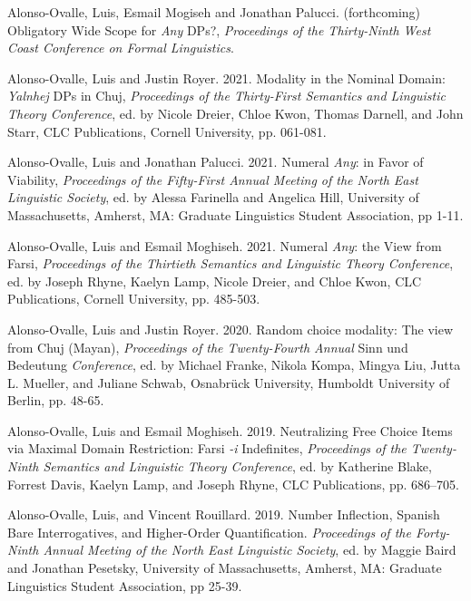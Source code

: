 \documentclass[11pt]{article}
\begin{document}
Alonso-Ovalle, Luis, Esmail Mogiseh and Jonathan Palucci. (forthcoming) Obligatory Wide Scope for \textit{Any} DPs?, \textit{Proceedings of the Thirty-Ninth West Coast Conference on Formal Linguistics}.

Alonso-Ovalle, Luis and Justin Royer. 2021. Modality in the Nominal Domain: \textit{Yalnhej} DPs in Chuj, \textit{Proceedings of the Thirty-First Semantics and Linguistic Theory Conference}, ed. by Nicole Dreier, Chloe Kwon, Thomas Darnell, and John Starr, CLC Publications, Cornell University, pp. 061-081.

Alonso-Ovalle, Luis and Jonathan Palucci. 2021. Numeral \textit{Any}: in Favor of Viability, \textit{Proceedings of the Fifty-First Annual Meeting of the North East Linguistic Society}, ed. by Alessa Farinella and Angelica Hill, University of Massachusetts, Amherst, MA: Graduate Linguistics Student Association, pp 1-11.

 Alonso-Ovalle, Luis and Esmail Moghiseh. 2021. Numeral \textit{Any}: the View from Farsi, \textit{Proceedings of the Thirtieth Semantics and Linguistic Theory Conference}, ed. by Joseph Rhyne, Kaelyn Lamp, Nicole Dreier, and Chloe Kwon, CLC Publications, Cornell University, pp. 485-503. %
      
    Alonso-Ovalle, Luis and Justin Royer. 2020. Random choice modality: The view from Chuj (Mayan), \textit{Proceedings of the Twenty-Fourth Annual} Sinn und Bedeutung \textit{Conference}, ed. by Michael Franke, Nikola Kompa, Mingya Liu, Jutta L. Mueller, and Juliane Schwab, Osnabr\"{u}ck University, Humboldt University of Berlin, pp. 48-65. 
    
      Alonso-Ovalle, Luis and Esmail Moghiseh. 2019. Neutralizing Free Choice Items via Maximal Domain
Restriction: Farsi \textit{-i} Indefinites, \textit{Proceedings of the Twenty-Ninth Semantics and Linguistic Theory Conference}, ed. by Katherine Blake, Forrest Davis, Kaelyn Lamp, and Joseph Rhyne, CLC Publications, pp. 686–705. 
      
Alonso-Ovalle, Luis, and Vincent Rouillard. 2019. Number Inflection, Spanish Bare Interrogatives, and Higher-Order Quantification. \textit{Proceedings
of the Forty-Ninth Annual Meeting of the North East Linguistic Society}, ed. by Maggie Baird and Jonathan Pesetsky, University of Massachusetts, Amherst, MA: Graduate Linguistics Student Association, pp 25-39.
 
\end{document}
